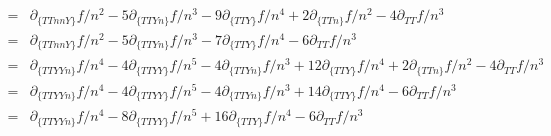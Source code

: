 \documentclass[11pt,letter]{article}
\begin{document}
\begin{equation}
\begin{split}
  =&\partial_{\{TTnnY\}}f/n^2-5\partial_{\{TTYn\}}f/n^3-9\partial_{\{TTY\}}f/n^4+2\partial_{\{TTn\}}f/n^2-4\partial_{TT}f/n^3\\
  =&\partial_{\{TTnnY\}}f/n^2-5\partial_{\{TTYn\}}f/n^3-7\partial_{\{TTY\}}f/n^4-6\partial_{TT}f/n^3\\
  =&\partial_{\{TTYYn\}}f/n^4-4\partial_{\{TTYY\}}f/n^5-4\partial_{\{TTYn\}}f/n^3+12\partial_{\{TTY\}}f/n^4+2\partial_{\{TTn\}}f/n^2-4\partial_{TT}f/n^3\\
  =&\partial_{\{TTYYn\}}f/n^4-4\partial_{\{TTYY\}}f/n^5-4\partial_{\{TTYn\}}f/n^3+14\partial_{\{TTY\}}f/n^4-6\partial_{TT}f/n^3\\
  =&\partial_{\{TTYYn\}}f/n^4-8\partial_{\{TTYY\}}f/n^5+16\partial_{\{TTY\}}f/n^4-6\partial_{TT}f/n^3\\
 \end{split}
\end{equation}
\end{document}
